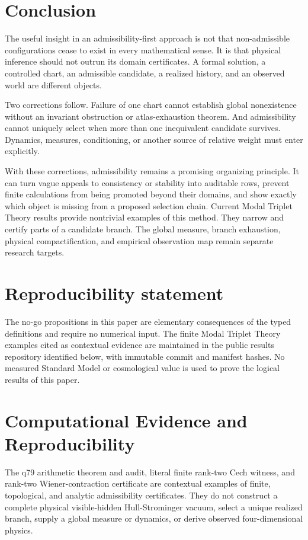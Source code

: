 \documentclass[11pt]{article}
\theoremstyle{definition}
\theoremstyle{remark}
\newcommand{\1}{\mathbf 1}
\newcommand{\MTT}{Modal Triplet Theory}
\begin{document}
\section{Conclusion}
\label{sec:conclusion}

The useful insight in an admissibility-first approach is not that
non-admissible configurations cease to exist in every mathematical sense.
It is that physical inference should not outrun its domain certificates.
A formal solution, a controlled chart, an admissible candidate, a realized
history, and an observed world are different objects.

Two corrections follow.  Failure of one chart cannot establish global
nonexistence without an invariant obstruction or atlas-exhaustion theorem.
And admissibility cannot uniquely select when more than one inequivalent
candidate survives.  Dynamics, measures, conditioning, or another source
of relative weight must enter explicitly.

With these corrections, admissibility remains a promising organizing
principle.  It can turn vague appeals to consistency or stability into
auditable rows, prevent finite calculations from being promoted beyond
their domains, and show exactly which object is missing from a proposed
selection chain.  Current \MTT{} results provide nontrivial examples of
this method.  They narrow and certify parts of a candidate branch.  The
global measure, branch exhaustion, physical compactification, and
empirical observation map remain separate research targets.

\section*{Reproducibility statement}

The no-go propositions in this paper are elementary consequences of the
typed definitions and require no numerical input.  The finite
\MTT{} examples cited as contextual evidence are maintained in the public
results repository identified below, with immutable commit and manifest
hashes.  No measured Standard Model or cosmological value is used to prove
the logical results of this paper.



\section*{Computational Evidence and Reproducibility}
The q79 arithmetic theorem and audit, literal finite rank-two Cech witness, and rank-two Wiener-contraction certificate are contextual examples of finite, topological, and analytic admissibility certificates. They do not construct a complete physical visible-hidden Hull-Strominger vacuum, select a unique realized branch, supply a global measure or dynamics, or derive observed four-dimensional physics.
\end{document}
